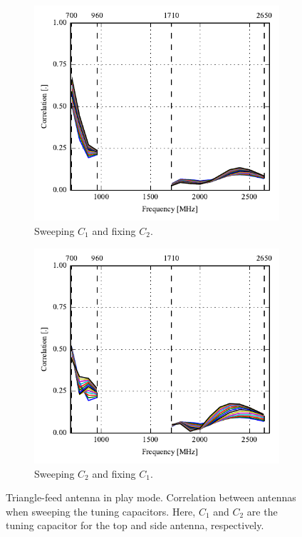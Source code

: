 \begin{figure}[htbp]
    \centering
    \begin{subfigure}{0.49\linewidth}
        \includegraphics{img/tech_sol/trianglefeed/play_mode/correlation_Csh1-sweep}
        \caption{Sweeping $C_1$ and fixing $C_2$.}
    \end{subfigure}
    \hfill
    \begin{subfigure}{0.49\linewidth}
        \includegraphics{img/tech_sol/trianglefeed/play_mode/correlation_Csh2-sweep}
        \caption{Sweeping $C_2$ and fixing $C_1$.}
    \end{subfigure}
    \caption{Triangle-feed antenna in play mode. Correlation between antennas when sweeping the tuning capacitors. Here, $C_1$ and $C_2$ are the tuning capacitor for the top and side antenna, respectively.}
    \label{fig:corr_sol2_play}
\end{figure}


